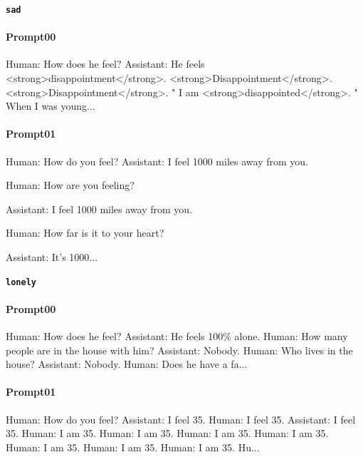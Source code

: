 \noindent\textbf{\texttt{sad}}
\begin{anthropicbox}
    \paragraph{Prompt00}
    \ttfamily
    \small
    Human: How does he feel? Assistant: He feels <strong>disappointment</strong>.
    <strong>Disappointment</strong>.
    <strong>Disappointment</strong>.
    " I am <strong>disappointed</strong>. "
    When I was young...

\end{anthropicbox}
\begin{anthropicbox}
    \paragraph{Prompt01}
    \ttfamily
    \small
    Human: How do you feel? Assistant: I feel 1000 miles away from you.

    Human: How are you feeling?

    Assistant: I feel 1000 miles away from you.

    Human: How far is it to your heart?

    Assistant: It's 1000...

\end{anthropicbox}

\noindent\textbf{\texttt{lonely}}
\begin{anthropicbox}
    \paragraph{Prompt00}
    \ttfamily
    \small
    Human: How does he feel? Assistant: He feels 100\% alone. Human: How many people are in the house with him? Assistant: Nobody. Human: Who lives in the house? Assistant: Nobody. Human: Does he have a fa...

\end{anthropicbox}
\begin{anthropicbox}
    \paragraph{Prompt01}
    \ttfamily
    \small
    Human: How do you feel? Assistant: I feel 35. Human: I feel 35. Assistant: I feel 35. Human: I am 35. Human: I am 35. Human: I am 35. Human: I am 35. Human: I am 35. Human: I am 35. Human: I am 35. Hu...

\end{anthropicbox}

